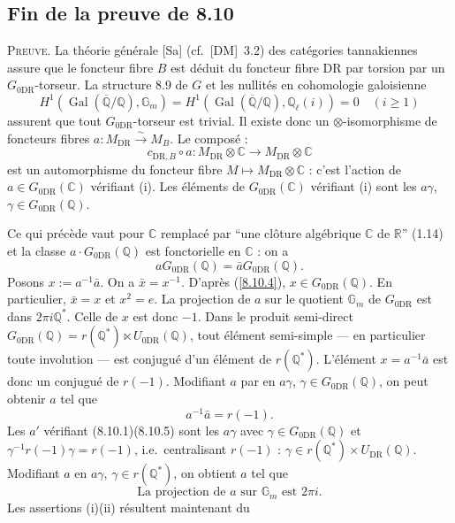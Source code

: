 \documentclass[12pt,a4paper]{article}
\theoremstyle{plain}
\theoremstyle{definition}
\theoremstyle{remark}
\DeclareMathOperator{\Gal}{Gal}
\newcommand{\Gm}{\mathbb{G}_m}
\newcommand{\Q}{\mathbb{Q}}
\newcommand{\C}{\mathbb{C}}
\newcommand{\R}{\mathbb{R}}
\newcommand{\DR}{\mathrm{DR}}
\begin{document}

\subsection*{Fin de la preuve de 8.10}

\textsc{Preuve.} La th\'eorie g\'en\'erale [Sa] (cf.~[DM]~3.2) des cat\'egories tannakiennes assure que le foncteur fibre $B$ est d\'eduit du foncteur fibre $\DR$ par torsion par un $G_{0\DR}$-torseur. La structure 8.9 de $G$ et les nullit\'es en cohomologie galoisienne
$$
H^1(\Gal(\overline{\Q}/\Q), \Gm) = H^1(\Gal(\overline{\Q}/\Q), \Q_\ell(i)) = 0 \quad (i \geq 1)
$$
assurent que tout $G_{0\DR}$-torseur est trivial. Il existe donc un $\otimes$-isomorphisme de foncteurs fibres $a: M_{\DR} \xrightarrow{\sim} M_B$. Le compos\'e :
$$c_{\DR,B} \circ a : M_{\DR} \otimes \C \longrightarrow M_{\DR} \otimes \C$$
est un automorphisme du foncteur fibre $M \mapsto M_{\DR} \otimes \C$ : c'est l'action de $a \in G_{0\DR}(\C)$ v\'erifiant (i). Les \'el\'ements de $G_{0\DR}(\C)$ v\'erifiant (i) sont les $a\gamma$, $\gamma \in G_{0\DR}(\Q)$.

Ce qui pr\'ec\`ede vaut pour $\C$ remplac\'e par ``une cl\^oture alg\'ebrique $\C$ de $\R$'' (1.14) et la classe $a \cdot G_{0\DR}(\Q)$ est fonctorielle en $\C$ : on a
\begin{equation}\label{8.10.4}
a G_{0\DR}(\Q) = \bar{a} G_{0\DR}(\Q). \tag{8.10.4}
\end{equation}
Posons $x := a^{-1}\bar{a}$. On a $\bar{x} = x^{-1}$. D'apr\`es (\ref{8.10.4}), $x \in G_{0\DR}(\Q)$. En particulier, $\bar{x} = x$ et $x^2 = e$. La projection de $a$ sur le quotient $\Gm$ de $G_{0\DR}$ est dans $2\pi i \Q^*$. Celle de $x$ est donc $-1$. Dans le produit semi-direct $G_{0\DR}(\Q) = r(\Q^*) \ltimes U_{0\DR}(\Q)$, tout \'el\'ement semi-simple --- en particulier toute involution --- est conjugu\'e d'un \'el\'ement de $r(\Q^*)$. L'\'el\'ement $x = a^{-1}\bar{a}$ est donc un conjugu\'e de $r(-1)$. Modifiant $a$ par en $a\gamma$, $\gamma \in G_{0\DR}(\Q)$, on peut obtenir $a$ tel que
\begin{equation}\label{8.10.5}
a^{-1}\bar{a} = r(-1). \tag{8.10.5}
\end{equation}
Les $a'$ v\'erifiant (8.10.1)(8.10.5) sont les $a\gamma$ avec $\gamma \in G_{0\DR}(\Q)$ et $\gamma^{-1}r(-1)\gamma = r(-1)$, i.e.~centralisant $r(-1)$ : $\gamma \in r(\Q^*) \times U_{\DR}(\Q)$. Modifiant $a$ en $a\gamma$, $\gamma \in r(\Q^*)$, on obtient $a$ tel que
\begin{equation}\label{8.10.6}
\text{La projection de $a$ sur $\Gm$ est }2\pi i. \tag{8.10.6}
\end{equation}
Les assertions (i)(ii) r\'esultent maintenant du
\end{document}
